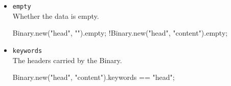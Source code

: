 \begin{itemize}
\item \lstinline|empty|\\
  Whether the data is empty.
\begin{urbiassert}[firstnumber=last]
Binary.new("head", "").empty;
!Binary.new("head", "content").empty;
\end{urbiassert}

\item \lstinline|keywords|\\
  The headers carried by the Binary.
\begin{urbiassert}[firstnumber=last]
Binary.new("head", "content").keywords == "head";
\end{urbiassert}
\end{itemize}



